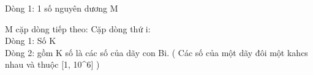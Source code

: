 Dòng 1: 1 số nguyên dương M

M cặp dòng tiếp theo: Cặp dòng thứ i:
\\Dòng 1: Số K
\\Dòng 2: gồm K số là các số của dãy con Bi. ( Các số của một dãy đôi một kahcs nhau và thuộc [1, 10^6] )

\